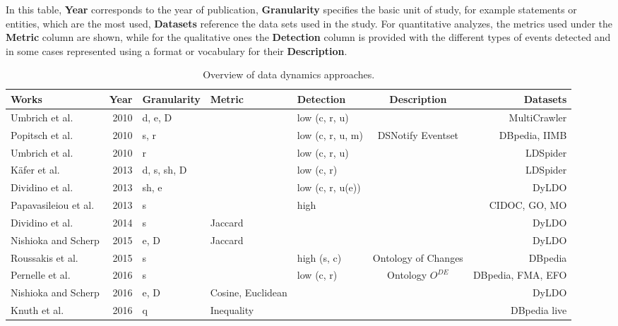 \documentclass[sw]{iosart2x}
\begin{document}
In this table, \textbf{Year} corresponds to the year of publication, \textbf{Granularity} specifies the basic unit of study, for example statements or entities, which are the most used, \textbf{Datasets} reference the data sets used in the study. For quantitative analyzes, the metrics used under the \textbf{Metric} column are shown, while for the qualitative ones the \textbf{Detection} column is provided with the different types of events detected and in some cases represented using a format or vocabulary for their \textbf{Description}.

\begin{table}[]
	\centering
	\caption{Overview of data dynamics approaches.}
	\label{tab:dyn}
	\begin{tabular}{lrlllcr}
		\hline
		Works & \multicolumn{1}{l}{Year} & Granularity & Metric  & Detection & Description  & Datasets \\ \hline
		Umbrich et al. \cite{UmbrichHHPD10} & 2010 & d, e, D &  & low (c, r, u)   &    & MultiCrawler \\
		Popitsch et al. \cite{PopitschHR10,PopitschH10,PopitschH11} & 2010 & s, r & & low (c, r, u, m) & DSNotify Eventset & DBpedia, IIMB\footnotemark \\
		Umbrich et al. \cite{UmbrichKL10} & 2010 & r &  & low (c, r, u)  & & LDSpider \\
		K{\"{a}}fer et al. \cite{KaferAUOH13} & 2013 & d, s, sh, D &  & low (c, r)   &  & LDSpider \\
		Dividino et al. \cite{DividinoSGG13} & 2013 & sh, e &  & low (c, r, u(e))  &   & DyLDO \\
		Papavasileiou et al. \cite{PapavasileiouFFKC13} & 2013 & s &  & high &    & CIDOC, GO, MO \\
		Dividino et al. \cite{DividinoGSG14} & 2014 & s & Jaccard &  &  & DyLDO \\
		Nishioka and Scherp \cite{NishiokaS15} & 2015 & e, D & Jaccard &  & & DyLDO \\
		Roussakis et al. \cite{RoussakisCSFS15,StefanidisFCR16} & 2015 & s &  & high (s, c) & Ontology of Changes  & DBpedia \\
		Pernelle et al. \cite{PernelleSMT16} & 2016 & s &  & low (c, r) & Ontology $O^{DE}$   & DBpedia, FMA, EFO \\
		Nishioka and Scherp \cite{NishiokaS16} & 2016 & e, D & Cosine, Euclidean &  &   & DyLDO \\  
		Knuth et al. \cite{KnuthHS16} & 2016 & q & Inequality &  &  & DBpedia live \\  

\end{tabular}
\end{table}
\end{document}
